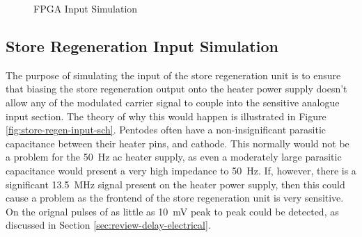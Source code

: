 \begin{figure}[ht]
	\centering
	\caption{FPGA Input Simulation}
	\label{fig:fpga-input-sim}
\end{figure}

\subsection{Store Regeneration Input Simulation}
The purpose of simulating the input of the store regeneration unit is to ensure that biasing the store regeneration output onto the heater power supply doesn't allow any of the modulated carrier signal to couple into the sensitive analogue input section. The theory of why this would happen is illustrated in Figure \ref{fig:store-regen-input-sch}. Pentodes often have a non-insignificant parasitic capacitance between their heater pins, and cathode. This normally would not be a problem for the \SI{50}{\hertz} \gls{ac} heater supply, as even a moderately large parasitic capacitance would present a very high impedance to \SI{50}{\hertz}. If, however, there is a significant \SI{13.5}{\mega\hertz} signal present on the heater power supply, then this could cause a problem as the frontend of the store regeneration unit is very sensitive. On the orignal pulses of as little as \SI{10}{\milli\volt} peak to peak could be detected, as discussed in Section \ref{sec:review-delay-electrical}.

